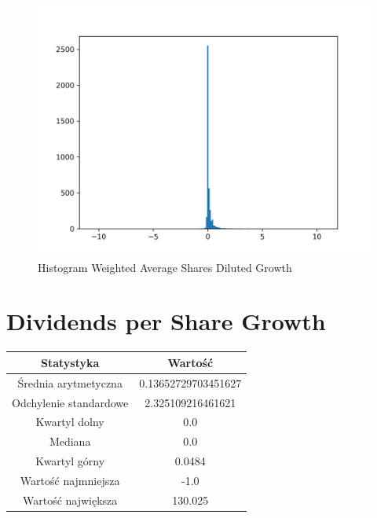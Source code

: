 \documentclass{article}
\begin{document}
\begin{figure}[h!]
    \includegraphics[width=\linewidth]{variables/Weighted Average Shares Diluted Growth.png}
    \caption{Histogram Weighted Average Shares Diluted Growth }
\end{figure}\section{ Dividends per Share Growth }

\begin{center}
    \begin{tabular}{|c | c|} 
    \hline
    Statystyka & Wartość \\
    \hline\hline
    Średnia arytmetyczna & 0.13652729703451627 \\ 
    \hline
    Odchylenie standardowe & 2.325109216461621 \\
    \hline
    Kwartyl dolny & 0.0 \\
    \hline
    Mediana & 0.0 \\
    \hline
    Kwartyl górny & 0.0484 \\
    \hline
    Wartość najmniejsza & -1.0 \\
    \hline
    Wartość największa & 130.025 \\
    \hline
   \end{tabular}
\end{center}
\end{document}
